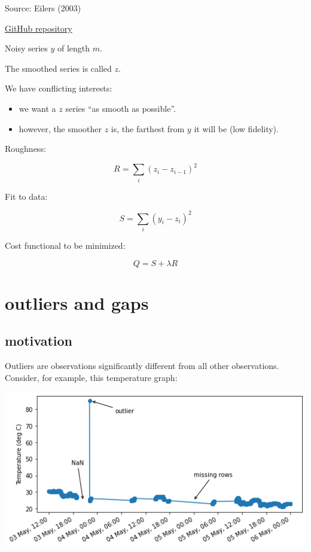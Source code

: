 \documentclass[
  letterpaper,
  DIV=11,
  numbers=noendperiod,
  oneside]{scrreprt}
\providecommand{\tightlist}{%
  \setlength{\itemsep}{0pt}\setlength{\parskip}{0pt}}\usepackage{longtable,booktabs,array}
\begin{document}
Source: Eilers (2003)

\href{https://github.com/mhvwerts/whittaker-eilers-smoother/tree/master}{GitHub
repository}

Noisy series \(y\) of length \(m\).

The smoothed series is called \(z\).

We have conflicting interests:

\begin{itemize}
\tightlist
\item
  we want a \(z\) series ``as smooth as possible''.
\item
  however, the smoother \(z\) is, the farthest from \(y\) it will be
  (low fidelity).
\end{itemize}

Roughness:

\[
R = \displaystyle\sum_i (z_i - z_{i-1})^2
\]

Fit to data:

\[
S = \displaystyle\sum_i (y_i - z_i)^2
\]

Cost functional to be minimized:

\[
Q = S + \lambda R
\]

\part{outliers and gaps}

\hypertarget{motivation-2}{%
\chapter{motivation}\label{motivation-2}}

Outliers are observations significantly different from all other
observations. Consider, for example, this temperature graph:

\includegraphics{outliers/temp-outlier.png}
\end{document}
